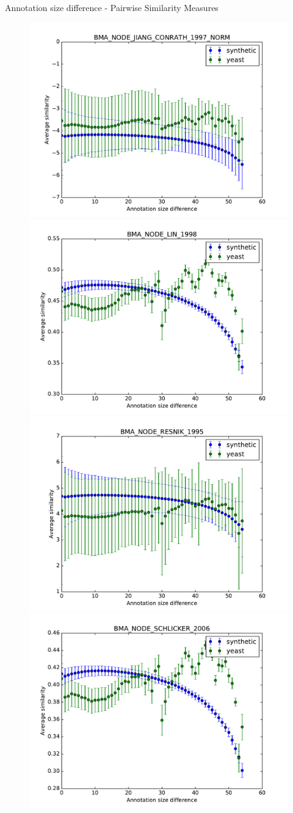 \documentclass{beamer}
\begin{document}
\begin{frame}{Annotation size difference - Pairwise Similarity Measures}

\begin{figure}

\includegraphics[width=0.5\linewidth, height=0.4\textheight]{pairwise_diff/SIM_GROUPWISE_BMA_SIM_PAIRWISE_DAG_NODE_JIANG_CONRATH_1997_NORM_diff.pdf}
\includegraphics[width=0.5\linewidth, height=0.4\textheight]{pairwise_diff/SIM_GROUPWISE_BMA_SIM_PAIRWISE_DAG_NODE_LIN_1998_diff.pdf}\\
\includegraphics[width=0.5\linewidth, height=0.4\textheight]{pairwise_diff/SIM_GROUPWISE_BMA_SIM_PAIRWISE_DAG_NODE_RESNIK_1995_diff.pdf}
\includegraphics[width=0.5\linewidth, height=0.4\textheight]{pairwise_diff/SIM_GROUPWISE_BMA_SIM_PAIRWISE_DAG_NODE_SCHLICKER_2006_diff.pdf}
\end{figure}

\end{frame}
\end{document}
